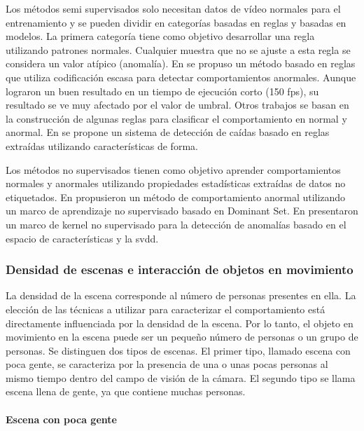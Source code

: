 Los métodos semi supervisados solo necesitan datos de vídeo normales para el entrenamiento y se pueden dividir en categorías basadas en reglas y basadas en modelos. La primera categoría tiene como objetivo desarrollar una regla utilizando patrones normales. Cualquier muestra que no se ajuste a esta regla se considera un valor atípico (anomalía). En \cite{6751449} se propuso un método basado en reglas que utiliza codificación escasa para detectar comportamientos anormales. Aunque lograron un buen resultado en un tiempo de ejecución corto (150 \gls{fps}), su resultado se ve muy afectado por el valor de umbral. Otros trabajos se basan en la construcción de algunas reglas para clasificar el comportamiento en normal y anormal. En \cite{6931308} se propone un sistema de detección de caídas basado en reglas extraídas utilizando características de forma.

Los métodos no supervisados tienen como objetivo aprender comportamientos normales y anormales utilizando propiedades estadísticas extraídas de datos no etiquetados. En \cite{alvar2014} propusieron un método de comportamiento anormal utilizando un marco de aprendizaje no supervisado basado en Dominant Set. En \cite{Ren2013UnsupervisedKL} presentaron un marco de kernel no supervisado para la detección de anomalías basado en el espacio de características y la \gls{svdd}.


\subsubsection*{Densidad de escenas e interacción de objetos en movimiento}
\label{subsubsec:densidad-escenas-interacción-objetos-movimiento}

La densidad de la escena corresponde al número de personas presentes en ella. La elección de las técnicas a utilizar para caracterizar el comportamiento está directamente influenciada por la densidad de la escena. Por lo tanto, el objeto en movimiento en la escena puede ser un pequeño número de personas o un grupo de personas. Se distinguen dos tipos de escenas. El primer tipo, llamado escena con poca gente, se caracteriza por la presencia de una o unas pocas personas al mismo tiempo dentro del campo de visión de la cámara. El segundo tipo se llama escena llena de gente, ya que contiene muchas personas.

\paragraph*{Escena con poca gente}\mbox{} \\
\label{parag:escena-poca-gente}

